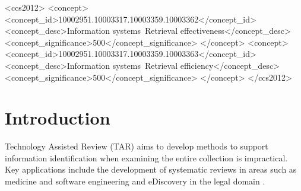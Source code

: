 \documentclass[sigconf,natbib=true,anonymous=true]{acmart}
\begin{document}
\begin{CCSXML}
<ccs2012>
<concept>
<concept_id>10002951.10003317.10003359.10003362</concept_id>
<concept_desc>Information systems~Retrieval effectiveness</concept_desc>
<concept_significance>500</concept_significance>
</concept>
<concept>
<concept_id>10002951.10003317.10003359.10003363</concept_id>
<concept_desc>Information systems~Retrieval efficiency</concept_desc>
<concept_significance>500</concept_significance>
</concept>
</ccs2012>
\end{CCSXML}




\maketitle

\section{Introduction}

Technology Assisted Review (TAR) aims to develop methods to support information identification when examining the entire collection is impractical. Key applications include the development of systematic reviews in areas such as medicine and software engineering \cite{higgins2019cochrane} and eDiscovery in the legal domain \cite{roegiest2015trec,grossman2016trec,oard2018jointly,mcdonald2020accuracy}. 
\end{document}
